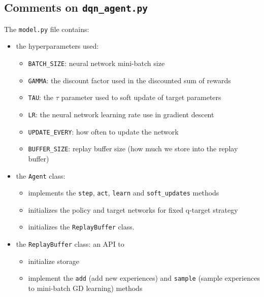 \documentclass[
]{article}
\providecommand{\tightlist}{%
  \setlength{\itemsep}{0pt}\setlength{\parskip}{0pt}}
\begin{document}
\hypertarget{comments-on-dqn_agent.py}{%
\subsection{\texorpdfstring{Comments on
\texttt{dqn\_agent.py}}{Comments on dqn\_agent.py}}\label{comments-on-dqn_agent.py}}

The \texttt{model.py} file contains:

\begin{itemize}
\tightlist
\item
  the hyperparameters used:

  \begin{itemize}
  \tightlist
  \item
    \texttt{BATCH\_SIZE}: neural network mini-batch size
  \item
    \texttt{GAMMA}: the discount factor used in the discounted sum of
    rewards
  \item
    \texttt{TAU}: the \(\tau\) parameter used to soft update of target
    parameters
  \item
    \texttt{LR}: the neural network learning rate use in gradient
    descent
  \item
    \texttt{UPDATE\_EVERY}: how often to update the network
  \item
    \texttt{BUFFER\_SIZE}: replay buffer size (how much we store into
    the replay buffer)
  \end{itemize}
\item
  the \texttt{Agent} class:

  \begin{itemize}
  \tightlist
  \item
    implements the \texttt{step}, \texttt{act}, \texttt{learn} and
    \texttt{soft\_updates} methods
  \item
    initializes the policy and target networks for fixed q-target
    strategy
  \item
    initializes the \texttt{ReplayBuffer} class.
  \end{itemize}
\item
  the \texttt{ReplayBuffer} class: an API to

  \begin{itemize}
  \tightlist
  \item
    initialize storage
  \item
    implement the \texttt{add} (add new experiences) and \texttt{sample}
    (sample experiences to mini-batch GD learning) methods
  \end{itemize}
\end{itemize}
\end{document}
